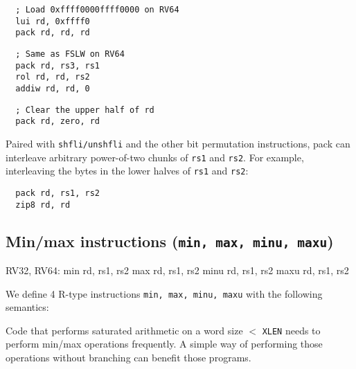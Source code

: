 \begin{minipage}{\linewidth}
\begin{verbatim}
  ; Load 0xffff0000ffff0000 on RV64
  lui rd, 0xffff0
  pack rd, rd, rd
\end{verbatim}
\end{minipage}

\begin{minipage}{\linewidth}
\begin{verbatim}
  ; Same as FSLW on RV64
  pack rd, rs3, rs1
  rol rd, rd, rs2
  addiw rd, rd, 0
\end{verbatim}
\end{minipage}

\begin{minipage}{\linewidth}
\begin{verbatim}
  ; Clear the upper half of rd
  pack rd, zero, rd
\end{verbatim}
\end{minipage}

Paired with {\tt shfli/unshfli} and the other bit permutation instructions,
pack can interleave arbitrary power-of-two chunks of {\tt rs1} and {\tt rs2}. For
example, interleaving the bytes in the lower halves of {\tt rs1} and {\tt rs2}:

\begin{minipage}{\linewidth}
\begin{verbatim}
  pack rd, rs1, rs2
  zip8 rd, rd
\end{verbatim}
\end{minipage}


\subsection{Min/max instructions (\texttt{min, max, minu, maxu})}

\begin{rvb}
  RV32, RV64:
    min rd, rs1, rs2
    max rd, rs1, rs2
    minu rd, rs1, rs2
    maxu rd, rs1, rs2
\end{rvb}

We define 4 R-type instructions \texttt{min, max, minu, maxu} with the
following semantics:



Code that performs saturated arithmetic on a word size $<$ \texttt{XLEN} needs to perform
min/max operations frequently. A simple way of performing those operations without branching
can benefit those programs.

